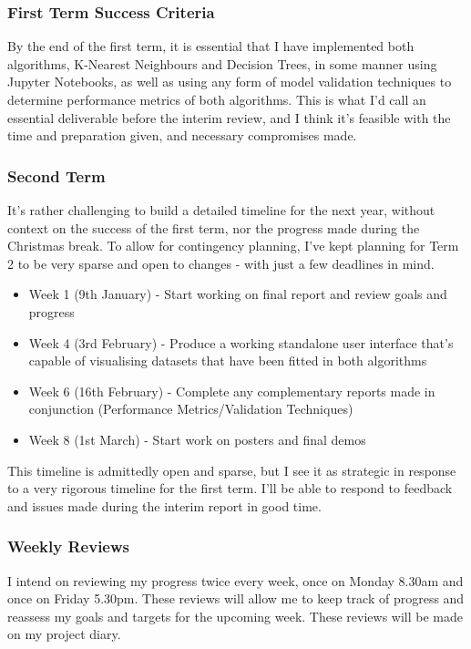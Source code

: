 \documentclass[letterpaper,10pt]{article}
\begin{document}
\subsubsection{First Term Success Criteria} 
By the end of the first term, it is essential that I have implemented both algorithms, K-Nearest Neighbours and Decision Trees, in some manner using Jupyter Notebooks, as well as using any form of model validation techniques to determine performance metrics of both algorithms. This is what I'd call an essential deliverable before the interim review, and I think it's feasible with the time and preparation given, and necessary compromises made.

\subsubsection{Second Term}
It's rather challenging to build a detailed timeline for the next year, without context on the success of the first term, nor the progress made during the Christmas break. To allow for contingency planning, I've kept planning for Term 2 to be very sparse and open to changes - with just a few deadlines in mind.
\begin{itemize}
    \item Week 1 (9th January) - Start working on final report and review goals and progress
    \item Week 4 (3rd February) - Produce a working standalone user interface that's capable of visualising datasets that have been fitted in both algorithms
    \item Week 6 (16th February) - Complete any complementary reports made in conjunction (Performance Metrics/Validation Techniques)
    \item Week 8 (1st March) - Start work on posters and final demos
\end{itemize}
This timeline is admittedly open and sparse, but I see it as strategic in response to a very rigorous timeline for the first term. I'll be able to respond to feedback and issues made during the interim report in good time.

\subsubsection{Weekly Reviews}
I intend on reviewing my progress twice every week, once on Monday 8.30am and once on Friday 5.30pm. These reviews will allow me to keep track of progress and reassess my goals and targets for the upcoming week. These reviews will be made on my project diary.
\newpage
\end{document}
